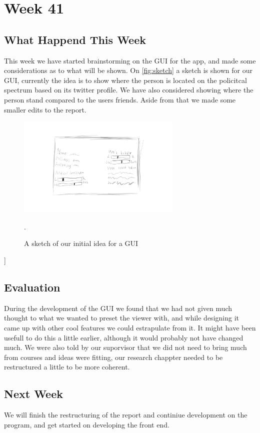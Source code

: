 \section*{Week 41}
\subsection*{What Happend This Week}
This week we have started brainstorming on the \ac{GUI} for the app, and made
some considerations as to what will be shown. On \autoref{fig:sketch} a sketch
is shown for our \ac{GUI}, currently the idea is to show where the person is
located on the policitcal spectrum based on its twitter profile. We have also
considered showing where the person stand compared to the users friends. Aside
from that we made some smaller edits to the report.

\begin{figure}[H] 
	\centering 
	\includegraphics[width = 0.7\textwidth]{figures/guisketch2.png}
	\caption{A sketch of our initial idea for a \ac{GUI}}.
	\label{fig:sketch}
\end{figure}]

\subsection*{Evaluation}
During the development of the \ac{GUI} we found that we had not given much
thought to what we wanted to preset the viewer with, and while designing it came
up with other cool features we could estrapulate from it. It might have been
usefull to do this a little earlier, although it would probably not have
changed much.
We were also told by our suporvisor that we did not need to bring much from
courses and ideas were fitting, our research chappter needed to be restructured
a little to be more coherent.


\subsection*{Next Week}
We will finish the restructuring of the report and continiue development on the
program, and get started on developing the front end.



% 
% 
% 
